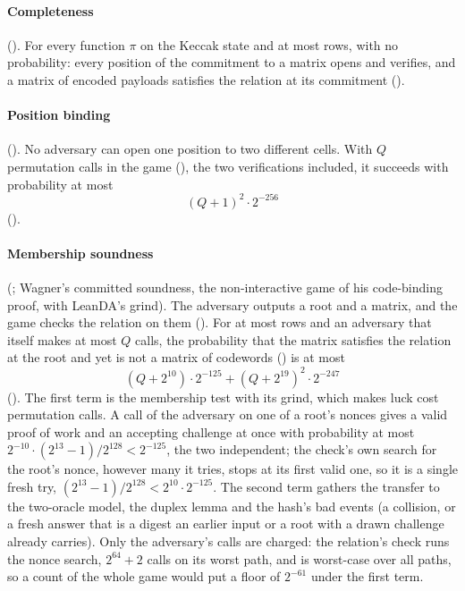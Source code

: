 \documentclass[11pt]{article}
\begin{document}
\paragraph{Completeness} (). For every function $\pi$ on the Keccak state and at most  rows, with no probability: every position of the commitment to a matrix opens and verifies, and a matrix of encoded payloads satisfies the relation at its commitment ().

\paragraph{Position binding} (). No adversary can open one
position to two different cells. With $Q$ permutation calls in the game (), the two verifications included, it succeeds with
probability at most
\[
\boxed{\ (Q+1)^2\cdot 2^{-256}\ }
\]
().

\paragraph{Membership soundness} (; Wagner's committed soundness, the non-interactive game of his code-binding proof, with LeanDA's grind). The adversary outputs a root and a matrix, and the game checks the relation on them (). For at most  rows and an adversary that itself makes at most $Q$ calls, the probability that the matrix satisfies the relation at the root and yet is not a matrix of codewords () is at most
\[
\boxed{\ (Q + 2^{10})\cdot 2^{-125} + (Q + 2^{19})^2\cdot 2^{-247}\ }
\]
(). The first term is the membership test with its grind, which makes luck cost permutation calls. A call of the adversary on one of a root's nonces gives a valid proof of work and an accepting challenge at once with probability at most $2^{-10}\cdot(2^{13}-1)/2^{128} < 2^{-125}$, the two independent; the check's own search for the root's nonce, however many it tries, stops at its first valid one, so it is a single fresh try, $(2^{13}-1)/2^{128} < 2^{10}\cdot 2^{-125}$. The second term gathers the transfer to the two-oracle model, the duplex lemma and the hash's bad events (a collision, or a fresh answer that is a digest an earlier input or a root with a drawn challenge already carries). Only the adversary's calls are charged: the relation's check runs the nonce search, $2^{64} + 2$ calls on its worst path, and  is worst-case over all paths, so a count of the whole game would put a floor of $2^{-61}$ under the first term.
\end{document}
